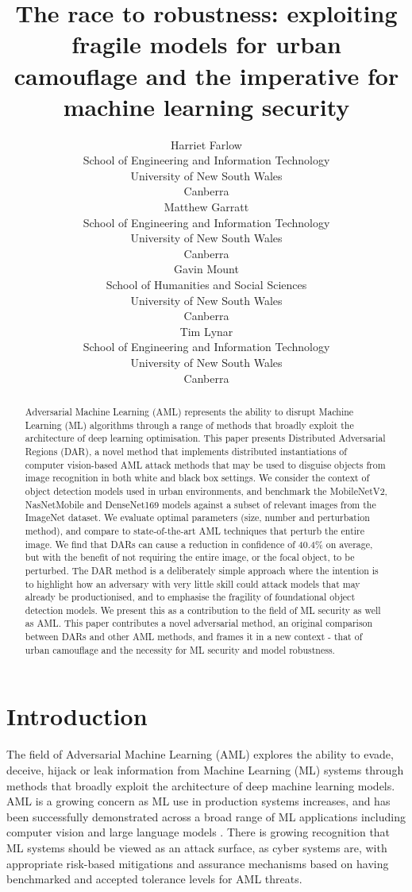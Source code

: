 \documentclass{article}
\title{The race to robustness: exploiting fragile models for urban camouflage and the imperative for machine learning security
}
\author{
  Harriet Farlow \\
  School of Engineering and Information Technology \\
  University of New South Wales \\
  Canberra\\
   \And
  Matthew Garratt \\
  School of Engineering and Information Technology \\
  University of New South Wales \\
  Canberra\\
  \And
  Gavin Mount \\
  School of Humanities and Social Sciences \\
  University of New South Wales \\
  Canberra\\
  \And
  Tim Lynar \\
  School of Engineering and Information Technology \\
  University of New South Wales \\
  Canberra\\
}
\begin{document}
\maketitle


\begin{abstract}
Adversarial Machine Learning (AML) represents the ability to disrupt Machine Learning (ML) algorithms through a range of methods that broadly exploit the architecture of deep learning optimisation. This paper presents Distributed Adversarial Regions (DAR), a novel method that implements distributed instantiations of computer vision-based AML attack methods that may be used to disguise objects from image recognition in both white and black box settings. We consider the context of object detection models used in urban environments, and benchmark the MobileNetV2, NasNetMobile and DenseNet169 models against a subset of relevant images from the ImageNet dataset. We evaluate optimal parameters (size, number and perturbation method), and compare to state-of-the-art AML techniques that perturb the entire image. We find that DARs can cause a reduction in confidence of 40.4\% on average, but with the benefit of not requiring the entire image, or the focal object, to be perturbed. The DAR method is a deliberately simple approach where the intention is to highlight how an adversary with very little skill could attack models that may already be productionised, and to emphasise the fragility of foundational object detection models. We present this as a contribution to the field of ML security as well as AML. This paper contributes a novel adversarial method, an original comparison between DARs and other AML methods, and frames it in a new context - that of urban camouflage and the necessity for ML security and model robustness.
\end{abstract}





\section{Introduction}\label{sec:intro}
The field of Adversarial Machine Learning (AML) explores the ability to evade, deceive, hijack or leak information from Machine Learning (ML) systems through methods that broadly exploit the architecture of deep machine learning models. AML is a growing concern as ML use in production systems increases, and has been successfully demonstrated across a broad range of ML applications including computer vision and large language models \cite{alsmadi_adversarial_2022}. There is growing recognition that ML systems should be viewed as an attack surface, as cyber systems are, with appropriate risk-based mitigations and assurance mechanisms based on having benchmarked and accepted tolerance levels for AML threats.
\end{document}

